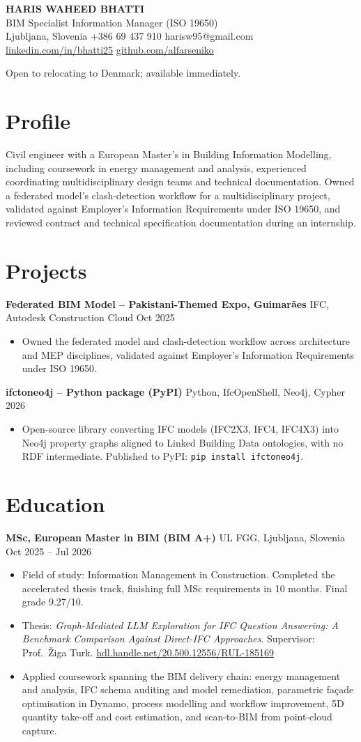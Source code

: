 \documentclass[a4paper,10.5pt]{article}
\newcommand{\datefill}{\dotfill}
\newcommand{\entry}[3]{\vspace{2.5pt}\noindent\textbf{#1} \textbar{} #2 \datefill{} #3\par\vspace{0.5pt}}
\newcommand{\ROLELINE}{BIM Specialist \textbar{} Information Manager (ISO 19650)}
\newcommand{\projIfcToNeo}{%
\entry{ifctoneo4j -- Python package (PyPI)}{Python, IfcOpenShell, Neo4j, Cypher}{2026}
\begin{itemize}
  \item Open-source library converting IFC models (IFC2X3, IFC4, IFC4X3) into Neo4j
        property graphs aligned to Linked Building Data ontologies, with no RDF
        intermediate. Published to PyPI: \texttt{pip install ifctoneo4j}.
\end{itemize}}
\newcommand{\projGuimaraes}{%
\entry{Federated BIM Model -- Pakistani-Themed Expo, Guimar\~aes}{IFC, Autodesk Construction Cloud}{Oct 2025}
\begin{itemize}
  \item Owned the federated model and clash-detection workflow across architecture
        and MEP disciplines, validated against Employer's Information Requirements
        under ISO 19650.
\end{itemize}}
\begin{document}
\begin{center}
  {\LARGE\bfseries HARIS WAHEED BHATTI}\\[2pt]
  {\large \ROLELINE}\\[3pt]
  Ljubljana, Slovenia \textbar{} +386 69 437 910 \textbar{} harisw95@gmail.com\\
  \href{https://linkedin.com/in/bhatti25}{linkedin.com/in/bhatti25} \textbar{}
  \href{https://github.com/alfarseniko}{github.com/alfarseniko}
\end{center}
\vspace{-4pt}
\noindent\small Open to relocating to Denmark; available immediately.\normalsize

\section{Profile}

\noindent Civil engineer with a European Master's in Building Information Modelling,
including coursework in energy management and analysis, experienced coordinating
multidisciplinary design teams and technical documentation. Owned a federated
model's clash-detection workflow for a multidisciplinary project, validated against
Employer's Information Requirements under ISO 19650, and reviewed contract and
technical specification documentation during an internship.

\section{Projects}

 \projGuimaraes \projIfcToNeo

\section{Education}
\entry{MSc, European Master in BIM (BIM A+)}{UL FGG, Ljubljana, Slovenia}{Oct 2025 -- Jul 2026}
\begin{itemize}
  \item Field of study: Information Management in Construction. Completed the
        accelerated thesis track, finishing full MSc requirements in 10 months.
        Final grade 9.27/10.
  \item Thesis: \textit{Graph-Mediated LLM Exploration for IFC Question Answering:
        A Benchmark Comparison Against Direct-IFC Approaches}. Supervisor:
        Prof.~\v{Z}iga Turk. \href{http://hdl.handle.net/20.500.12556/RUL-185169}{hdl.handle.net/20.500.12556/RUL-185169}
  \item Applied coursework spanning the BIM delivery chain: energy management and analysis, IFC schema auditing and model remediation, parametric façade optimisation in Dynamo, process modelling and workflow improvement, 5D quantity take-off and cost estimation, and scan-to-BIM from point-cloud capture.
\end{itemize}
\end{document}
